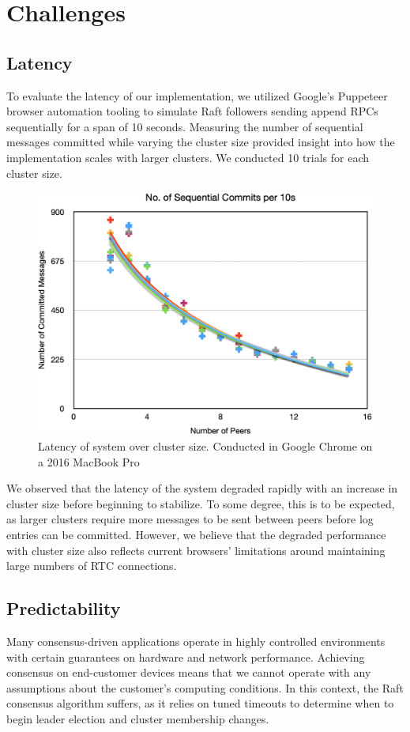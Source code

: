 \documentclass[11pt,twocolumn]{article}
\begin{document}
\section{Challenges}

\subsection{Latency}
To evaluate the latency of our implementation, we utilized Google's Puppeteer browser automation tooling to simulate Raft followers sending append RPCs sequentially for a span of 10 seconds. Measuring the number of sequential messages committed while varying the cluster size provided insight into how the implementation scales with larger clusters. We conducted 10 trials for each cluster size.\\

\begin{figure}[t]
\centering
\includegraphics[scale=0.4]{performance}
\caption{Latency of system over cluster size. Conducted in Google Chrome on a 2016 MacBook Pro}
\end{figure}

We observed that the latency of the system degraded rapidly with an increase in cluster size before beginning to stabilize. To some degree, this is to be expected, as larger clusters require more messages to be sent between peers before log entries can be committed. However, we believe that the degraded performance with cluster size also reflects current browsers' limitations around maintaining large numbers of RTC connections.

\subsection{Predictability}
Many consensus-driven applications operate in highly controlled environments with certain guarantees on hardware and network performance. Achieving consensus on end-customer devices means that we cannot operate with any assumptions about the customer's computing conditions. In this context, the Raft consensus algorithm suffers, as it relies on tuned timeouts to determine when to begin leader election and cluster membership changes.
\end{document}
